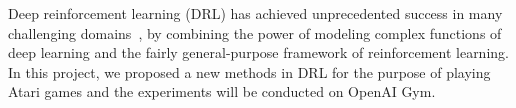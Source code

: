 Deep reinforcement learning (DRL) has achieved
unprecedented success in many challenging
domains~\cite{mnih2015human,silver2016mastering}, by combining the power of modeling complex
functions of deep learning and the fairly general-purpose framework of reinforcement learning.
In this project, we proposed a new methods in DRL for the purpose of playing Atari games and 
the experiments will be conducted on OpenAI Gym. 